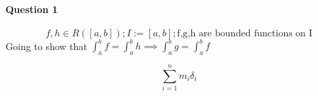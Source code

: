 \documentclass[20pt]{extarticle} %
\begin{document}
\paragraph{Question 1}
\[ f,h \in R([a,b]);I:=[a,b];\text{f,g,h are bounded functions on I} \]
Going to show that $\int_{a}^{b} f = \int_{a}^{b} h \implies \int_{a}^{b} g = \int_{a}^{b} f$

\[ \sum_{i=1}^{n} m_{i} \delta_{i} \]
\end{document}
